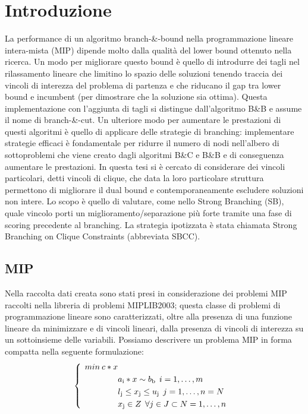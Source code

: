 \documentclass[12pt,a4paper,twoside,openright]{book}
\begin{document}
\mainmatter

\chapter{Introduzione}
La performance di un algoritmo branch-\&-bound nella programmazione lineare intera-mista (MIP)
dipende molto dalla qualità del lower bound ottenuto nella ricerca. Un modo per migliorare questo bound è quello di introdurre dei tagli nel rilassamento lineare che limitino lo spazio delle soluzioni tenendo traccia
dei vincoli di interezza del problema di partenza e che riducano il gap tra lower bound e incumbent (per dimostrare che la soluzione sia ottima).
Questa implementazione con l'aggiunta di tagli si distingue dall'algoritmo B\&B e assume il nome di branch-\&-cut.
Un ulteriore modo per aumentare le prestazioni di questi algoritmi è quello di applicare delle strategie di branching: implementare strategie efficaci è fondamentale per ridurre il numero di nodi nell'albero di sottoproblemi che viene creato 
dagli algoritmi B\&C e B\&B e di conseguenza aumentare le prestazioni.
In questa tesi si è cercato di considerare dei vincoli particolari, detti vincoli di clique,
che data la loro particolare struttura permettono di migliorare il dual bound e contemporaneamente escludere 
soluzioni non intere. Lo scopo è quello di valutare, come nello Strong Branching (SB), quale vincolo porti un 
miglioramento/separazione più forte tramite una fase di scoring precedente al branching. La strategia
ipotizzata è stata chiamata Strong Branching on Clique Constraints (abbreviata SBCC).

\section{MIP}
Nella raccolta dati creata sono stati presi in considerazione dei problemi
MIP raccolti nella libreria di problemi MIPLIB2003; questa classe di problemi
di programmazione lineare sono caratterizzati, oltre alla presenza di una funzione
lineare da minimizzare e di vincoli lineari, dalla presenza di vincoli di interezza
su un sottoinsieme delle variabili. Possiamo descrivere un problema MIP in forma compatta
nella seguente formulazione: 
\begin{equation}
    \begin{dcases}
        \begin{split}
            \:\:min\:c*x \\
            &a\textsubscript{i}*x \sim b\textsubscript{b} \:\:i = 1,\ldots,m\\
            &l\textsubscript{j} \leq x\textsubscript{j} \leq u\textsubscript{j} \:\:j= 1, \ldots , n = N\\
            &x\textsubscript{j} \in Z \:\: \forall j \in J \subset N = {1,\ldots,n}
        \end{split}
    \end{dcases}
\end{equation}
\end{document}
